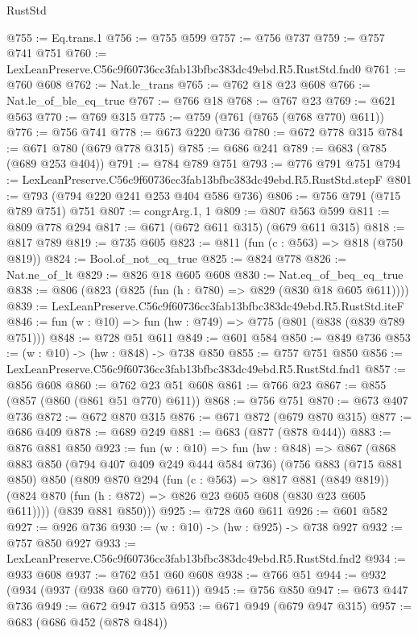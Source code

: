 \begin{lexlean}{RustStd}
\begin{coremodule}
@755 := Eq.trans.{1}
@756 := @755 @599
@757 := @756 @737
@759 := @757 @741 @751
@760 := LexLeanPreserve.C56c9f60736cc3fab13bfbc383dc49ebd.R5.RustStd.fnd0
@761 := @760 @608
@762 := Nat.le_trans
@765 := @762 @18 @23 @608
@766 := Nat.le_of_ble_eq_true
@767 := @766 @18
@768 := @767 @23
@769 := @621 @563
@770 := @769 @315
@775 := @759 (@761 (@765 (@768 @770) @611))
@776 := @756 @741
@778 := @673 @220 @736
@780 := @672 @778 @315
@784 := @671 @780 (@679 @778 @315)
@785 := @686 @241
@789 := @683 (@785 (@689 @253 @404))
@791 := @784 @789 @751
@793 := @776 @791 @751
@794 := LexLeanPreserve.C56c9f60736cc3fab13bfbc383dc49ebd.R5.RustStd.stepF
@801 := @793 (@794 @220 @241 @253 @404 @586 @736)
@806 := @756 @791 (@715 @789 @751) @751
@807 := congrArg.{1, 1}
@809 := @807 @563 @599
@811 := @809 @778 @294
@817 := @671 (@672 @611 @315) (@679 @611 @315)
@818 := @817 @789
@819 := @735 @605
@823 := @811 (fun (c : @563) => @818 (@750 @819))
@824 := Bool.of_not_eq_true
@825 := @824 @778
@826 := Nat.ne_of_lt
@829 := @826 @18 @605 @608
@830 := Nat.eq_of_beq_eq_true
@838 := @806 (@823 (@825 (fun (h : @780) => @829 (@830 @18 @605 @611))))
@839 := LexLeanPreserve.C56c9f60736cc3fab13bfbc383dc49ebd.R5.RustStd.iteF
@846 := fun (w : @10) => fun (hw : @749) => @775 (@801 (@838 (@839 @789 @751)))
@848 := @728 @51 @611
@849 := @601 @584
@850 := @849 @736
@853 := (w : @10) -> (hw : @848) -> @738 @850
@855 := @757 @751 @850
@856 := LexLeanPreserve.C56c9f60736cc3fab13bfbc383dc49ebd.R5.RustStd.fnd1
@857 := @856 @608
@860 := @762 @23 @51 @608
@861 := @766 @23
@867 := @855 (@857 (@860 (@861 @51 @770) @611))
@868 := @756 @751
@870 := @673 @407 @736
@872 := @672 @870 @315
@876 := @671 @872 (@679 @870 @315)
@877 := @686 @409
@878 := @689 @249
@881 := @683 (@877 (@878 @444))
@883 := @876 @881 @850
@923 := fun (w : @10) =>
  fun (hw : @848) =>
  @867
    (@868
      @883
      @850
      (@794 @407 @409 @249 @444 @584 @736)
      (@756
        @883
        (@715 @881 @850)
        @850
        (@809
          @870
          @294
          (fun (c : @563) => @817 @881 (@849 @819))
          (@824 @870 (fun (h : @872) => @826 @23 @605 @608 (@830 @23 @605 @611))))
        (@839 @881 @850)))
@925 := @728 @60 @611
@926 := @601 @582
@927 := @926 @736
@930 := (w : @10) -> (hw : @925) -> @738 @927
@932 := @757 @850 @927
@933 := LexLeanPreserve.C56c9f60736cc3fab13bfbc383dc49ebd.R5.RustStd.fnd2
@934 := @933 @608
@937 := @762 @51 @60 @608
@938 := @766 @51
@944 := @932 (@934 (@937 (@938 @60 @770) @611))
@945 := @756 @850
@947 := @673 @447 @736
@949 := @672 @947 @315
@953 := @671 @949 (@679 @947 @315)
@957 := @683 (@686 @452 (@878 @484))

\end{coremodule}
\end{lexlean}
